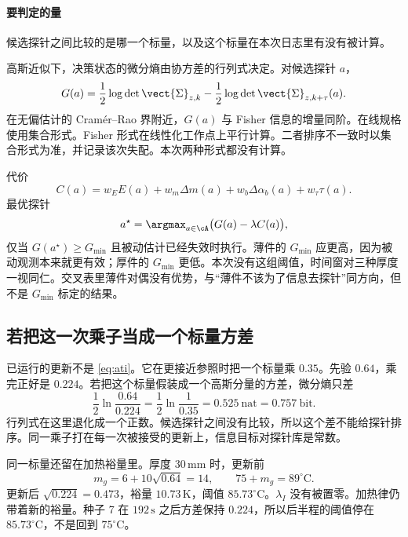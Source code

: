 \paragraph{要判定的量}
候选探针之间比较的是哪一个标量，以及这个标量在本次日志里有没有被计算。

高斯近似下，决策状态的微分熵由协方差的行列式决定。对候选探针 \(a\)，
\begin{equation}
\label{eq:ati}
G(a)=\frac12\log\det\vect{\Sigma}_{z,k}
-\frac12\log\det\vect{\Sigma}_{z,k+\tau}(a).
\end{equation}
在无偏估计的 Cramér–Rao 界附近，\(G(a)\) 与 Fisher 信息的增量同阶。在线规格使用集合形式。Fisher 形式在线性化工作点上平行计算。二者排序不一致时以集合形式为准，并记录该次失配。本次两种形式都没有计算。

代价
\begin{equation}
\label{eq:cost}
C(a)=w_E E(a)+w_m\Delta m(a)+w_b\Delta\alpha_b(a)+w_\tau\tau(a).
\end{equation}
最优探针
\begin{equation}
\label{eq:astar}
a^\star=\argmax_{a\in\cA}\big(G(a)-\lambda C(a)\big),
\end{equation}
仅当 \(G(a^\star)\ge G_{\min}\) 且被动估计已经失效时执行。薄件的 \(G_{\min}\) 应更高，因为被动观测本来就更有效；厚件的 \(G_{\min}\) 更低。本次没有这组阈值，时间窗对三种厚度一视同仁。交叉表里薄件对偶没有优势，与“薄件不该为了信息去探针”同方向，但不是 \(G_{\min}\) 标定的结果。

\subsection{若把这一次乘子当成一个标量方差}

已运行的更新不是 \eqref{eq:ati}。它在更接近参照时把一个标量乘 \(0.35\)。先验 \(0.64\)，乘完正好是 \(0.224\)。若把这个标量假装成一个高斯分量的方差，微分熵只差
\begin{equation}
\label{eq:nats}
\frac12\ln\frac{0.64}{0.224}
=\frac12\ln\frac{1}{0.35}
=0.525\ \mathrm{nat}
=0.757\ \mathrm{bit}.
\end{equation}
行列式在这里退化成一个正数。候选探针之间没有比较，所以这个差不能给探针排序。同一乘子打在每一次被接受的更新上，信息目标对探针库是常数。

同一标量还留在加热裕量里。厚度 \(30\,\mathrm{mm}\) 时，更新前
\[
m_g=6+10\sqrt{0.64}=14,\qquad 75+m_g=89^\circ\mathrm{C}.
\]
更新后 \(\sqrt{0.224}=0.473\)，裕量 \(10.73\,\mathrm{K}\)，阈值 \(85.73^\circ\mathrm{C}\)。\(\lambda_I\) 没有被置零。加热律仍带着新的裕量。种子 7 在 \(192\,\mathrm{s}\) 之后方差保持 \(0.224\)，所以后半程的阈值停在 \(85.73^\circ\mathrm{C}\)，不是回到 \(75^\circ\mathrm{C}\)。

